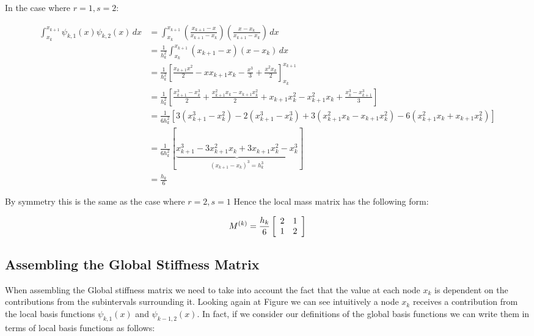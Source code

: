 In the case where $r = 1, s = 2$:

\begin{align*}
	\int_{x_k}^{x_{k+1}}\psi_{k,1}(x)\psi_{k,2}(x)\, dx &=
    \int_{x_k}^{x_{k+1}}\left(\frac{x_{k+1} - x}{x_{k+1} - x_k}\right)
                        \left(\frac{x - x_k}{x_{k+1} - x_k}\right)\, dx \\
    &= \frac{1}{h_k^2}\int_{x_k}^{x_{k+1}}(x_{k+1} - x)(x - x_k)\, dx \\
    &= \frac{1}{h_k^2}\left[\frac{x_{k+1}x^2}{2} - xx_{k+1}x_k 
                            -\frac{x^3}{3} + \frac{x^2x_k}{2}\right]_{x_k}^{x_{k+1}} \\
    &= \frac{1}{h_k^2}\left[\frac{x_{k+1}^3 - x_k^3}{2} +
                            \frac{x_{k+1}^2x_k - x_{k+1}x_k^2}{2} +
                            x_{k+1}x_k^2 - x_{k+1}^2x_k + 
                            \frac{x_k^3 - x_{k+1}^3}{3}\right] \\
    &= \frac{1}{6h_k^2}\left[3(x_{k+1}^3 - x_k^2) - 2(x_{k+1}^3 - x_k^3)
                           + 3(x_{k+1}^2x_k - x_{k+1}x_k^2) - 6(x_{k+1}^2x_k + x_{k+1}x_k^2)\right] \\
    &= \frac{1}{6h_k^2}
          [\underbrace{x_{k+1}^3 - 3x_{k+1}^2x_k + 3x_{k+1}x_k^2 - x_k^3}_{(x_{k+1} - x_k)^3 = h_k^3}] \\
    &= \frac{h_k}{6}
\end{align*}

By symmetry this is the same as the case where $r = 2, s = 1$ Hence the local mass matrix
has the following form:

\begin{equation}\label{eq:oned-deterministic-local-mass}
	M^{(k)} = \frac{h_k}{6}\left[\begin{array}{c c}
    				2 & 1 \\ 1 & 2 
              \end{array}\right]	
\end{equation}

\subsection{Assembling the Global Stiffness Matrix}


When assembling the Global stiffness matrix we need to take into account the fact that the value at each node
$x_k$ is dependent on the contributions from the subintervals surrounding it. Looking again at
Figure  we can see intuitively a node $x_k$ receives a contribution from the local basis functions
$\psi_{k,1}(x)$ and $\psi_{{k-1},2}(x)$. In fact, if we consider our definitions of the global basis functions
 we can write them in terms of local basis functions as follows:


